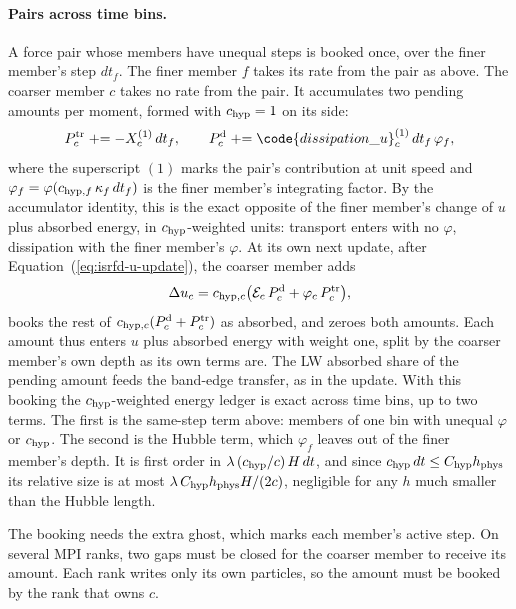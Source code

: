 \paragraph{Pairs across time bins.} A force pair whose members
have unequal steps is booked once, over the finer member's step $dt_f$. The
finer member $f$ takes its rate from the pair as above. The coarser member $c$
takes no rate from the pair. It accumulates two pending amounts per moment,
formed with $c_{\rm hyp} = 1$ on its side:
\begin{equation}
  P^{\rm tr}_c \mathrel{+}= -X^{(1)}_c\, dt_f,
  \qquad
  P^{\rm d}_c \mathrel{+}= \code{dissipation\_u}^{(1)}_c\, dt_f\, \varphi_f,
  \label{eq:isrfd-pending}
\end{equation}
where the superscript $(1)$ marks the pair's contribution at unit speed and
$\varphi_f = \varphi(c_{{\rm hyp},f}\,\kappa_f\, dt_f)$ is the finer member's
integrating factor. By the accumulator identity, this is the exact opposite of
the finer member's change of $u$ plus absorbed energy, in
$c_{\rm hyp}$-weighted units: transport enters with no $\varphi$, dissipation
with the finer member's $\varphi$. At its own next update, after
Equation~(\ref{eq:isrfd-u-update}), the coarser member adds
\begin{equation}
  \Delta u_c = c_{{\rm hyp},c}\big(\mathcal{E}_c\, P^{\rm d}_c
    + \varphi_c\, P^{\rm tr}_c\big),
  \label{eq:isrfd-pending-add}
\end{equation}
books the rest of $c_{{\rm hyp},c}(P^{\rm d}_c + P^{\rm tr}_c)$ as absorbed,
and zeroes both amounts. Each amount thus enters $u$ plus absorbed energy with
weight one, split by the coarser member's own depth as its own terms are. The
LW absorbed share of the pending amount feeds the band-edge transfer, as in the
update. With this booking the $c_{\rm hyp}$-weighted energy ledger is exact
across time bins, up to two terms. The first is the same-step term above:
members of one bin with unequal $\varphi$ or $c_{\rm hyp}$. The second is the
Hubble term, which $\varphi_f$ leaves out of the finer member's depth. It is
first order in $\lambda\,(c_{\rm hyp}/c)\,H\,dt$, and since
$c_{\rm hyp}\,dt \le C_{\rm hyp} h_{\rm phys}$ its relative size is at most
$\lambda\, C_{\rm hyp} h_{\rm phys} H / (2c)$, negligible for any $h$ much
smaller than the Hubble length.

The booking needs the extra ghost, which marks each member's active step. On
several MPI ranks, two gaps must be closed for the coarser member to receive
its amount. Each rank writes only its own particles, so the amount must be
booked by the rank that owns $c$.

